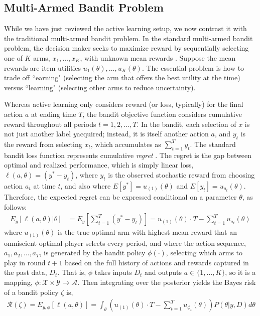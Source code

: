 \documentclass[nonblindrev]{informs3}
\newcommand{\numitems}{K}
\newcommand{\risk}{\mathcal{R}}
\begin{document}
\subsection{Multi-Armed Bandit Problem}

While we have just reviewed the active learning setup, we now contrast it with the traditional multi-armed bandit problem. In the standard multi-armed bandit problem, the decision maker seeks to maximize reward by sequentially selecting one of $\numitems$ arms, $x_1,\ldots,x_\numitems$, with unknown mean rewards \citep{GittinsEtAl2011,Robbins1952,thompson1933likelihood}. Suppose the mean rewards are item utilities $u_1(\theta), \ldots, u_\numitems(\theta)$. The essential problem is how to trade off ``earning" (selecting the arm that offers the best utility at the time) versus ``learning" (selecting other arms to reduce uncertainty). 

Whereas active learning only considers reward (or loss, typically) for the final action $a$ at ending time $T$, the bandit objective function considers cumulative reward throughout all periods $t=1,2,...,T$. In the bandit, each selection of $x$ is not just another label $y$acquired; instead, it is itself another action $a$, and $y_t$ is the reward from selecting $x_t$, which accumulates as $\sum_{t=1}^{T} y_t$. The standard bandit loss function represents cumulative \emph{regret} \citep{Auer2002,LaiRobbins1985}. The regret is the gap between optimal and realized performance, which is simply linear loss, $\ell(a,\theta) = (y^{*} - y_t)$, where $y_t$ is the observed stochastic reward from choosing action $a_t$ at time $t$, and also where $E[y^{*}] = u_{(1)}(\theta)$ and $E[y_t] = u_{a_t}(\theta)$. Therefore, the expected regret can be expressed conditional on a parameter $\theta$, as follows:
\begin{align}
E_{y}\left[ \ell(a,\theta) | \theta \right] &= E_{y}\left[ \sum_{t=1}^{T} (y^{*} - y_t) \right] = u_{(1)}(\theta) \cdot T - \sum_{t=1}^{T} u_{a_t}(\theta) 
\end{align}
where $u_{(1)}(\theta)$ is the true optimal arm with highest mean reward that an omniscient optimal player selects every period, and where the action sequence, $a_1,a_2,\ldots,a_T$, is generated by the bandit policy $\phi(\cdot)$, selecting which arms to play in round $t+1$ based on the full history of actions and rewards captured in the past data, $D_t$. That is, $\phi$ takes inputs $D_{t}$ and outputs $a \in \{1,\ldots,\numitems\}$, so it is a mapping, $\phi: \mathcal{X} \times \mathcal{Y} \to \mathcal{A}$. Then integrating over the posterior yields the Bayes risk of a bandit policy $\zeta$ is,
\begin{align}
\risk(\zeta) = E_{y,\phi}\left[ \ell(a,\theta) \right] = 
\int_{\theta} \left(  u_{(1)}(\theta) \cdot T - \sum_{t=1}^{T} u_{\phi_t}(\theta) \right) P(\theta|y,D)  d\theta
\end{align}
\end{document}

